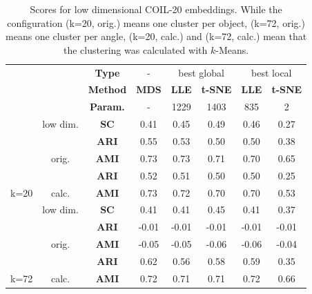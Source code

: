 \begin{table}[]
\centering
\begin{tabular}{cc|c|c|cc|cc|}
\cline{3-8}
 &  & \textbf{Type} & - & \multicolumn{2}{c|}{best global} & \multicolumn{2}{c|}{best local} \\ \cline{3-8} 
 &  & \textbf{Method} & {\color[HTML]{1B9E77} \textbf{MDS}} & \multicolumn{1}{c|}{{\color[HTML]{D95F02} \textbf{LLE}}} & {\color[HTML]{7570B3} \textbf{t-SNE}} & \multicolumn{1}{c|}{{\color[HTML]{D95F02} \textbf{LLE}}} & {\color[HTML]{7570B3} \textbf{t-SNE}} \\ \cline{3-8} 
 &  & \textbf{Param.} & {\color[HTML]{000000} -} & \multicolumn{1}{c|}{1229} & 1403 & \multicolumn{1}{c|}{835} & 2 \\ \hline
\multicolumn{1}{|c|}{} & low dim. & \textbf{SC} & 0.41 & \multicolumn{1}{c|}{0.45} & 0.49 & \multicolumn{1}{c|}{0.46} & 0.27 \\ \cline{2-8} 
\multicolumn{1}{|c|}{} &  & \textbf{ARI} & 0.55 & \multicolumn{1}{c|}{0.53} & 0.50 & \multicolumn{1}{c|}{0.50} & 0.38 \\ \cline{3-8} 
\multicolumn{1}{|c|}{} & \multirow{-2}{*}{orig.} & \textbf{AMI} & 0.73 & \multicolumn{1}{c|}{0.73} & 0.71 & \multicolumn{1}{c|}{0.70} & 0.65 \\ \cline{2-8} 
\multicolumn{1}{|c|}{} &  & \textbf{ARI} & 0.52 & \multicolumn{1}{c|}{0.51} & 0.50 & \multicolumn{1}{c|}{0.50} & 0.25 \\ \cline{3-8} 
\multicolumn{1}{|c|}{\multirow{-5}{*}{k=20}} & \multirow{-2}{*}{calc.} & \textbf{AMI} & 0.73 & \multicolumn{1}{c|}{0.72} & 0.70 & \multicolumn{1}{c|}{0.70} & 0.53 \\ \hline
\multicolumn{1}{|c|}{} & low dim. & \textbf{SC} & 0.41 & \multicolumn{1}{c|}{0.41} & 0.45 & \multicolumn{1}{c|}{0.41} & 0.37 \\ \cline{2-8} 
\multicolumn{1}{|c|}{} &  & \textbf{ARI} & -0.01 & \multicolumn{1}{c|}{-0.01} & -0.01 & \multicolumn{1}{c|}{-0.01} & -0.01 \\ \cline{3-8} 
\multicolumn{1}{|c|}{} & \multirow{-2}{*}{orig.} & \textbf{AMI} & -0.05 & \multicolumn{1}{c|}{-0.05} & -0.06 & \multicolumn{1}{c|}{-0.06} & -0.04 \\ \cline{2-8} 
\multicolumn{1}{|c|}{} &  & \textbf{ARI} & 0.62 & \multicolumn{1}{c|}{0.56} & 0.58 & \multicolumn{1}{c|}{0.59} & 0.35 \\ \cline{3-8} 
\multicolumn{1}{|c|}{\multirow{-5}{*}{k=72}} & \multirow{-2}{*}{calc.} & \textbf{AMI} & 0.72 & \multicolumn{1}{c|}{0.71} & 0.71 & \multicolumn{1}{c|}{0.72} & 0.66 \\ \hline
\end{tabular}
\caption[Cluster Evaluation on COIL-20]{Scores for low dimensional COIL-20 embeddings. While the configuration (k=20, orig.) means one cluster per object, (k=72, orig.) means one cluster per angle, (k=20, calc.) and (k=72, calc.) mean that the clustering was calculated with $k$-Means.}
\label{tab:clu_coil}
\end{table}

